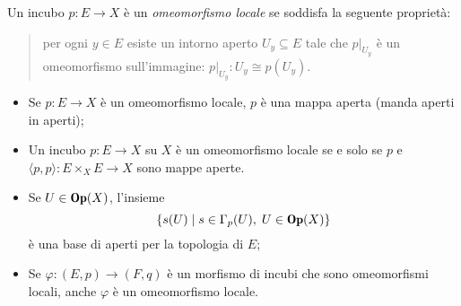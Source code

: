 \begin{df}
Un incubo $p\colon E\to X$ \`e un \emph{omeomorfismo locale} se soddisfa la seguente propriet\`a:
\begin{quote}
per ogni $y\in E$ esiste un intorno aperto $U_y\subseteq E$ tale che $p|_{U_y}$ \`e un omeomorfismo sull'immagine: $p|_{U_y}\colon U_y\cong p(U_y)$.
\end{quote}
\end{df}
\begin{MyExercise}
\begin{itemize}
\item Se $p\colon E\to X$ \`e un omeomorfismo locale, $p$ \`e una mappa aperta (manda aperti in aperti);
\item Un incubo $p\colon E\to X$ su $X$ \`e un omeomorfismo locale se e solo se $p$ e $\langle p,p\rangle\colon E\times_X E\to X$ sono mappe aperte.
\item Se $U\in \cate{Op}(X)$, l'insieme
\[
\{ s(U)\mid s\in\Gamma_p (U),\; U\in\cate{Op}(X)\}
\]
\`e una base di aperti per la topologia di $E$;
\item Se $\varphi\colon (E,p)\to (F, q)$ \`e un morfismo di incubi che sono omeomorfismi locali, anche $\varphi$ \`e un omeomorfismo locale.
\end{itemize}
\end{MyExercise}
